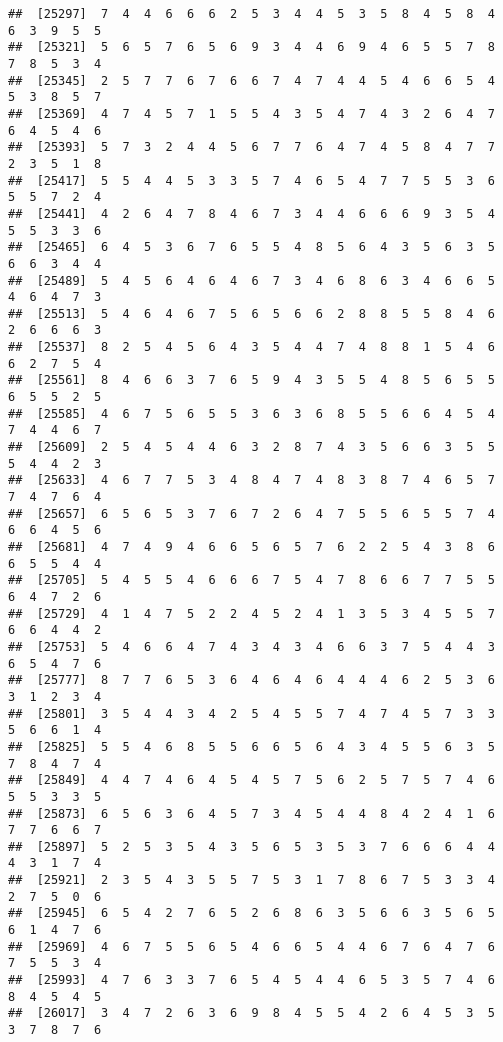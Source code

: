 \documentclass[
]{book}
\begin{document}
\begin{verbatim}
##  [25297]  7  4  4  6  6  6  2  5  3  4  4  5  3  5  8  4  5  8  4  6  3  9  5  5
##  [25321]  5  6  5  7  6  5  6  9  3  4  4  6  9  4  6  5  5  7  8  7  8  5  3  4
##  [25345]  2  5  7  7  6  7  6  6  7  4  7  4  4  5  4  6  6  5  4  5  3  8  5  7
##  [25369]  4  7  4  5  7  1  5  5  4  3  5  4  7  4  3  2  6  4  7  6  4  5  4  6
##  [25393]  5  7  3  2  4  4  5  6  7  7  6  4  7  4  5  8  4  7  7  2  3  5  1  8
##  [25417]  5  5  4  4  5  3  3  5  7  4  6  5  4  7  7  5  5  3  6  5  5  7  2  4
##  [25441]  4  2  6  4  7  8  4  6  7  3  4  4  6  6  6  9  3  5  4  5  5  3  3  6
##  [25465]  6  4  5  3  6  7  6  5  5  4  8  5  6  4  3  5  6  3  5  6  6  3  4  4
##  [25489]  5  4  5  6  4  6  4  6  7  3  4  6  8  6  3  4  6  6  5  4  6  4  7  3
##  [25513]  5  4  6  4  6  7  5  6  5  6  6  2  8  8  5  5  8  4  6  2  6  6  6  3
##  [25537]  8  2  5  4  5  6  4  3  5  4  4  7  4  8  8  1  5  4  6  6  2  7  5  4
##  [25561]  8  4  6  6  3  7  6  5  9  4  3  5  5  4  8  5  6  5  5  6  5  5  2  5
##  [25585]  4  6  7  5  6  5  5  3  6  3  6  8  5  5  6  6  4  5  4  7  4  4  6  7
##  [25609]  2  5  4  5  4  4  6  3  2  8  7  4  3  5  6  6  3  5  5  5  4  4  2  3
##  [25633]  4  6  7  7  5  3  4  8  4  7  4  8  3  8  7  4  6  5  7  7  4  7  6  4
##  [25657]  6  5  6  5  3  7  6  7  2  6  4  7  5  5  6  5  5  7  4  6  6  4  5  6
##  [25681]  4  7  4  9  4  6  6  5  6  5  7  6  2  2  5  4  3  8  6  6  5  5  4  4
##  [25705]  5  4  5  5  4  6  6  6  7  5  4  7  8  6  6  7  7  5  5  6  4  7  2  6
##  [25729]  4  1  4  7  5  2  2  4  5  2  4  1  3  5  3  4  5  5  7  6  6  4  4  2
##  [25753]  5  4  6  6  4  7  4  3  4  3  4  6  6  3  7  5  4  4  3  6  5  4  7  6
##  [25777]  8  7  7  6  5  3  6  4  6  4  6  4  4  4  6  2  5  3  6  3  1  2  3  4
##  [25801]  3  5  4  4  3  4  2  5  4  5  5  7  4  7  4  5  7  3  3  5  6  6  1  4
##  [25825]  5  5  4  6  8  5  5  6  6  5  6  4  3  4  5  5  6  3  5  7  8  4  7  4
##  [25849]  4  4  7  4  6  4  5  4  5  7  5  6  2  5  7  5  7  4  6  5  5  3  3  5
##  [25873]  6  5  6  3  6  4  5  7  3  4  5  4  4  8  4  2  4  1  6  7  7  6  6  7
##  [25897]  5  2  5  3  5  4  3  5  6  5  3  5  3  7  6  6  6  4  4  4  3  1  7  4
##  [25921]  2  3  5  4  3  5  5  7  5  3  1  7  8  6  7  5  3  3  4  2  7  5  0  6
##  [25945]  6  5  4  2  7  6  5  2  6  8  6  3  5  6  6  3  5  6  5  6  1  4  7  6
##  [25969]  4  6  7  5  5  6  5  4  6  6  5  4  4  6  7  6  4  7  6  7  5  5  3  4
##  [25993]  4  7  6  3  3  7  6  5  4  5  4  4  6  5  3  5  7  4  6  8  4  5  4  5
##  [26017]  3  4  7  2  6  3  6  9  8  4  5  5  4  2  6  4  5  3  5  3  7  8  7  6

\end{verbatim}
\end{document}

